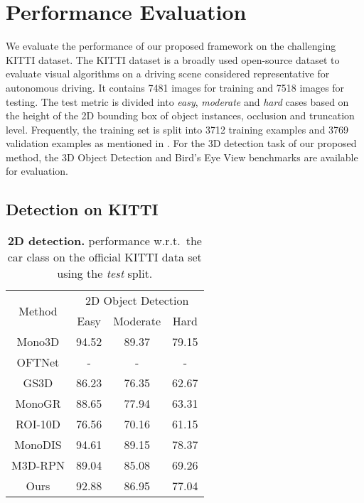 \documentclass[10pt,twocolumn,letterpaper]{article}
\begin{document}
\section{Performance Evaluation} \label{sec:Eval}

    We evaluate the performance of our proposed framework on the challenging KITTI dataset. The KITTI dataset is a broadly used open-source dataset to evaluate visual algorithms on a driving scene considered representative for autonomous driving. It contains 7481 images for training and 7518 images for testing. The test metric is divided into \textit{easy}, \textit{moderate} and \textit{hard} cases based on the height of the 2D bounding box of object instances, occlusion and truncation level. Frequently, the training set is split into 3712 training examples and 3769 validation examples as mentioned in \cite{mono3d_2016}. For the 3D detection task of our proposed method, the 3D Object Detection and Bird's Eye View benchmarks are available for evaluation. 
    
\subsection{Detection on KITTI}
    \begin{table}[t]
    \centering
    \vspace{2mm}
    \begin{tabular}{c||ccc}
    \hline
    \multirow{2}{*}{Method} & \multicolumn{3}{c}{2D Object Detection} \\ \cline{2-4} 
                              & Easy         & Moderate    & Hard         \\ \hline
    Mono3D\cite{mono3d_2016}  & 94.52        & 89.37       & 79.15        \\
    OFTNet\cite{oft_2019}     & -            & -           & -            \\
    GS3D\cite{GS3D_2019}      & 86.23        & 76.35       & 62.67        \\
    MonoGR\cite{monogr2019}   & 88.65        & 77.94       & 63.31       \\
    ROI-10D\cite{roi10d_2019} & 76.56        & 70.16       & 61.15       \\
    MonoDIS\cite{monodis_2019}& 94.61        & 89.15       & 78.37       \\
    M3D-RPN\cite{m3drpn_2019} & 89.04        & 85.08       & 69.26       \\ \hline \hline 
    Ours                      & 92.88        & 86.95       & 77.04       \\ \hline
    \end{tabular}
    \vspace{3mm}
    \caption{\textbf{2D detection.}  performance w.r.t.~the  car  class  on  the  official KITTI data set using the \textit{test} split.}
    \label{2d_detection} \vspace{-3mm}
    \end{table}
\end{document}
